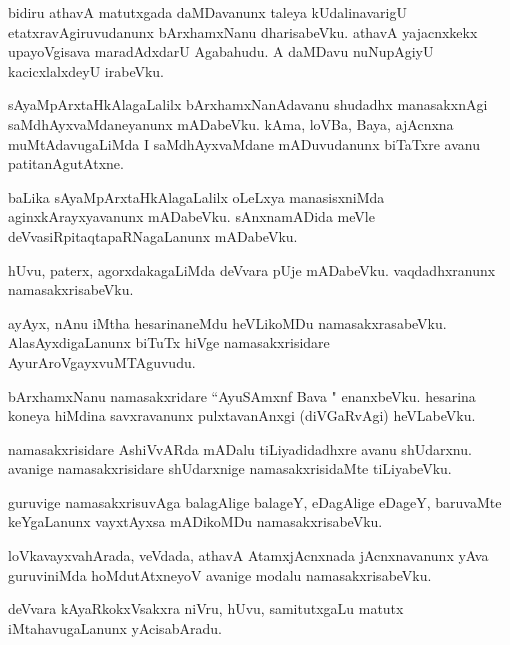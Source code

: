 \documentclass{article}
\begin{document}
\begin{mn}
bidiru athavA matutxgada daMDavanunx taleya kUdalinavarigU etatxravAgiruvudanunx bArxhamxNanu 
dharisabeVku. athavA yajacnxkekx upayoVgisava maradAdxdarU Agabahudu. A daMDavu nuNupAgiyU 
kacicxlalxdeyU irabeVku.
\end{mn}

\begin{mn}
sAyaMpArxtaHkAlagaLalilx bArxhamxNanAdavanu shudadhx manasakxnAgi saMdhAyxvaMdaneyanunx 
mADabeVku. kAma, loVBa, Baya, ajAcnxna muMtAdavugaLiMda I saMdhAyxvaMdane mADuvudanunx biTaTxre 
avanu patitanAgutAtxne.
\end{mn}

\begin{mn}
baLika sAyaMpArxtaHkAlagaLalilx oLeLxya manasisxniMda aginxkArayxyavanunx mADabeVku. sAnxnamADida 
meVle deVvasiRpitaqtapaRNagaLanunx mADabeVku.
\end{mn}

\begin{mn}
hUvu, paterx, agorxdakagaLiMda deVvara pUje mADabeVku. vaqdadhxranunx namasakxrisabeVku.
\end{mn}

\begin{mn}
ayAyx, nAnu iMtha hesarinaneMdu heVLikoMDu namasakxrasabeVku. AlasAyxdigaLanunx biTuTx 
hiVge namasakxrisidare AyurAroVgayxvuMTAguvudu.
\end{mn}

\begin{mn}
bArxhamxNanu namasakxridare ``AyuSAmxnf Bava " enanxbeVku. hesarina koneya hiMdina 
savxravanunx pulxtavanAnxgi (diVGaRvAgi) heVLabeVku.
\end{mn}

\begin{mn}
namasakxrisidare AshiVvARda mADalu tiLiyadidadhxre avanu shUdarxnu. avanige 
namasakxrisidare shUdarxnige namasakxrisidaMte tiLiyabeVku.
\end{mn}

\begin{mn}
guruvige namasakxrisuvAga balagAlige balageY, eDagAlige eDageY, baruvaMte keYgaLanunx 
vayxtAyxsa mADikoMDu namasakxrisabeVku.
\end{mn}

\begin{mn}
loVkavayxvahArada, veVdada, athavA AtamxjAcnxnada jAcnxnavanunx yAva guruviniMda 
hoMdutAtxneyoV avanige modalu namasakxrisabeVku.
\end{mn}

\begin{mn}
deVvara kAyaRkokxVsakxra niVru, hUvu, samitutxgaLu matutx iMtahavugaLanunx yAcisabAradu.
\end{mn}
\end{document}
